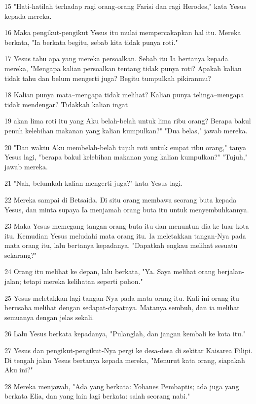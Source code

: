 \par 15 "Hati-hatilah terhadap ragi orang-orang Farisi dan ragi Herodes," kata Yesus kepada mereka.
\par 16 Maka pengikut-pengikut Yesus itu mulai mempercakapkan hal itu. Mereka berkata, "Ia berkata begitu, sebab kita tidak punya roti."
\par 17 Yesus tahu apa yang mereka persoalkan. Sebab itu Ia bertanya kepada mereka, "Mengapa kalian persoalkan tentang tidak punya roti? Apakah kalian tidak tahu dan belum mengerti juga? Begitu tumpulkah pikiranmu?
\par 18 Kalian punya mata--mengapa tidak melihat? Kalian punya telinga--mengapa tidak mendengar? Tidakkah kalian ingat
\par 19 akan lima roti itu yang Aku belah-belah untuk lima ribu orang? Berapa bakul penuh kelebihan makanan yang kalian kumpulkan?" "Dua belas," jawab mereka.
\par 20 "Dan waktu Aku membelah-belah tujuh roti untuk empat ribu orang," tanya Yesus lagi, "berapa bakul kelebihan makanan yang kalian kumpulkan?" "Tujuh," jawab mereka.
\par 21 "Nah, belumkah kalian mengerti juga?" kata Yesus lagi.
\par 22 Mereka sampai di Betsaida. Di situ orang membawa seorang buta kepada Yesus, dan minta supaya Ia menjamah orang buta itu untuk menyembuhkannya.
\par 23 Maka Yesus memegang tangan orang buta itu dan menuntun dia ke luar kota itu. Kemudian Yesus meludahi mata orang itu. Ia meletakkan tangan-Nya pada mata orang itu, lalu bertanya kepadanya, "Dapatkah engkau melihat sesuatu sekarang?"
\par 24 Orang itu melihat ke depan, lalu berkata, "Ya. Saya melihat orang berjalan-jalan; tetapi mereka kelihatan seperti pohon."
\par 25 Yesus meletakkan lagi tangan-Nya pada mata orang itu. Kali ini orang itu berusaha melihat dengan sedapat-dapatnya. Matanya sembuh, dan ia melihat semuanya dengan jelas sekali.
\par 26 Lalu Yesus berkata kepadanya, "Pulanglah, dan jangan kembali ke kota itu."
\par 27 Yesus dan pengikut-pengikut-Nya pergi ke desa-desa di sekitar Kaisarea Filipi. Di tengah jalan Yesus bertanya kepada mereka, "Menurut kata orang, siapakah Aku ini?"
\par 28 Mereka menjawab, "Ada yang berkata: Yohanes Pembaptis; ada juga yang berkata Elia, dan yang lain lagi berkata: salah seorang nabi."
